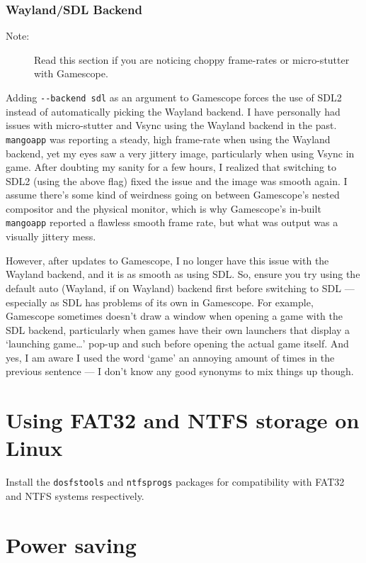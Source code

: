\documentclass[a4paper]{article}
\begin{document}
\subsubsection{Wayland/SDL Backend}

\begin{description}
    \item[Note:] Read this section if you are noticing choppy frame-rates or micro-stutter with Gamescope.
\end{description}

Adding \lstinline|--backend sdl| as an argument to Gamescope forces the use of SDL2 instead of automatically picking the Wayland backend.
I have personally had issues with micro-stutter and Vsync using the Wayland backend in the past.
\lstinline|mangoapp| was reporting a steady, high frame-rate when using the Wayland backend, yet my eyes saw a very jittery image, particularly when using Vsync in game.
After doubting my sanity for a few hours, I realized that switching to SDL2 (using the above flag) fixed the issue and the image was smooth again.
I assume there's some kind of weirdness going on between Gamescope's nested compositor and the physical monitor, which is why Gamescope's in-built \lstinline|mangoapp| reported a flawless smooth frame rate, but what was output was a visually jittery mess.

However, after updates to Gamescope, I no longer have this issue with the Wayland backend, and it is as smooth as using SDL.
So, ensure you try using the default auto (Wayland, if on Wayland) backend first before switching to SDL --- especially as SDL has problems of its own in Gamescope.
For example, Gamescope sometimes doesn't draw a window when opening a game with the SDL backend, particularly when games have their own launchers that display a `launching game…' pop-up and such before opening the actual game itself.
And yes, I am aware I used the word `game' an annoying amount of times in the previous sentence --- I don't know any good synonyms to mix things up though.


\section{Using FAT32 and NTFS storage on Linux}

Install the \lstinline|dosfstools| and \lstinline|ntfsprogs| packages for compatibility with FAT32 and NTFS systems respectively.

\section{Power saving}
\end{document}
